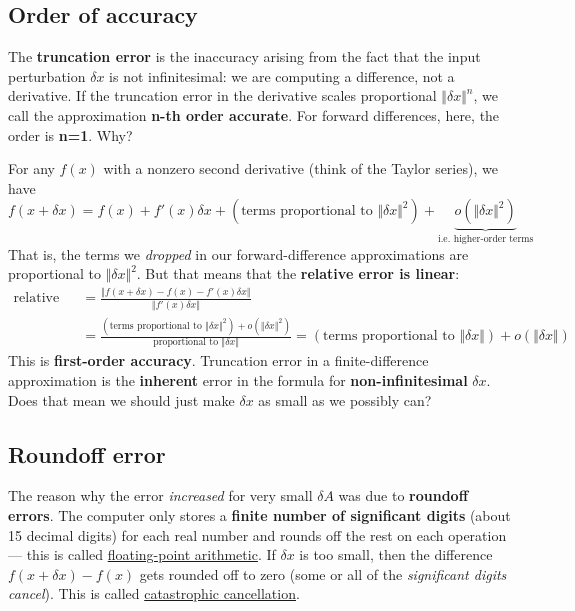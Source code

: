 \subsection{Order of accuracy}

The \textbf{truncation error} is the inaccuracy arising from the fact that the input perturbation $\delta x$ is not infinitesimal: we are computing a difference, not a derivative.
If the truncation error in the derivative scales proportional $\Vert \delta x \Vert^n$, we call the approximation \textbf{n-th order accurate}.  For forward differences, here, the order is \textbf{n=1}.  Why?

For any $f(x)$ with a nonzero second derivative (think of the Taylor series), we have
\begin{displaymath}
	f(x + \delta x) = f(x) + f'(x) \delta x + (\text{terms proportional to }\Vert \delta x \Vert^2) + \underbrace{o(\Vert \delta x \Vert^2)}_\text{i.e. higher-order terms}
\end{displaymath}
That is, the terms we \textit{dropped} in our forward-difference approximations are proportional to $\Vert \delta x\Vert^2$.  But that means that the \textbf{relative error is linear}:
\begin{align*}
	\text{relative error} &= \frac{\Vert f(x+\delta x) - f(x) - f'(x) \delta x \Vert}{\Vert f'(x) \delta x \Vert} \\
	&= \frac{(\text{terms proportional to }\Vert \delta x \Vert^2) + o(\Vert \delta x \Vert^2)}{\text{proportional to }\Vert \delta x \Vert} = (\text{terms proportional to }\Vert \delta x \Vert) + o(\Vert \delta x \Vert)
\end{align*}
This is \textbf{first-order accuracy}.
Truncation error in a finite-difference approximation is the \textbf{inherent} error in the formula for \textbf{non-infinitesimal} $\delta x$.  Does that mean we should just make $\delta x$ as small as we possibly can?

\subsection{Roundoff error}


The reason why the error \textit{increased} for very small $\delta A$ was due to \textbf{roundoff errors}.  The computer only stores a \textbf{finite number of significant digits} (about 15 decimal digits) for each real number and rounds off the rest on each operation — this is called  \href{https://en.wikipedia.org/wiki/Floating-point_arithmetic}{floating-point arithmetic}. If $\delta x$ is too small, then the difference $f(x+\delta x) - f(x)$ gets rounded off to zero (some or all of the \textit{significant digits cancel}).  This is called  \href{https://en.wikipedia.org/wiki/Catastrophic_cancellation}{catastrophic cancellation}.

